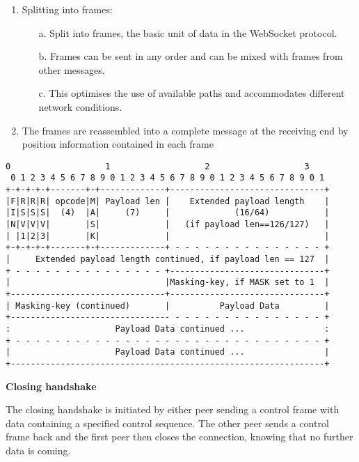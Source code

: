 \begin{enumerate}
  \item Splitting into frames:
        \begin{enumerate}
          \item[a.] Split into frames, the basic unit of data in the WebSocket protocol.
          \item[b.] Frames can be sent in any order and can be mixed with frames from other messages.
          \item[c.] This optimises the use of available paths and accommodates different network conditions.
        \end{enumerate}
  \item The frames are reassembled into a complete message at the receiving end by position information contained in each frame
\end{enumerate}

\begin{lstlisting}[caption=Frame format, style=nohighlight]
 0                   1                   2                   3
 0 1 2 3 4 5 6 7 8 9 0 1 2 3 4 5 6 7 8 9 0 1 2 3 4 5 6 7 8 9 0 1
+-+-+-+-+-------+-+-------------+-------------------------------+
|F|R|R|R| opcode|M| Payload len |    Extended payload length    |
|I|S|S|S|  (4)  |A|     (7)     |             (16/64)           |
|N|V|V|V|       |S|             |   (if payload len==126/127)   |
| |1|2|3|       |K|             |                               |
+-+-+-+-+-------+-+-------------+ - - - - - - - - - - - - - - - +
|     Extended payload length continued, if payload len == 127  |
+ - - - - - - - - - - - - - - - +-------------------------------+
|                               |Masking-key, if MASK set to 1  |
+-------------------------------+-------------------------------+
| Masking-key (continued)       |          Payload Data         |
+-------------------------------- - - - - - - - - - - - - - - - +
:                     Payload Data continued ...                :
+ - - - - - - - - - - - - - - - - - - - - - - - - - - - - - - - +
|                     Payload Data continued ...                |
+---------------------------------------------------------------+
\end{lstlisting}

\textbf{Closing handshake}

The closing handshake is initiated by either peer sending a control frame with data containing a specified control sequence. The other peer sends a control frame back and the first peer then closes the connection, knowing that no further data is coming.

